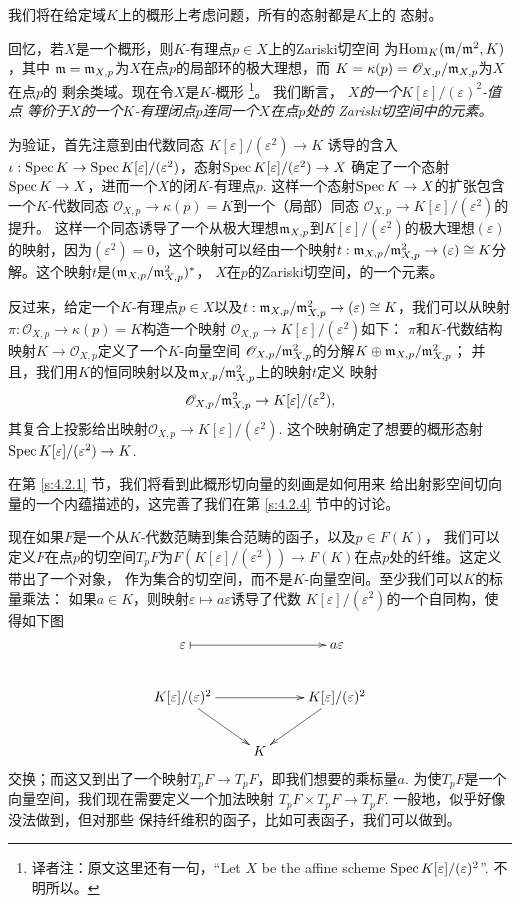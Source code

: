 我们将在给定域$K$上的概形上考虑问题，所有的态射都是$K$上的
态射。

回忆，若$X$是一个概形，则$K$-有理点$p\in X$上的Zariski切空间
为$\operatorname{Hom}_K(\mathfrak{m}/\mathfrak{m}^2,K)$，其中
$\mathfrak{m}=\mathfrak{m}_{X,p}$为$X$在点$p$的局部环的极大理想，而
$K=\kappa(p)=\mathscr O_{X,p}/\mathfrak{m}_{X,p}$为$X$在点$p$的
剩余类域。现在令$X$是$K$-概形%
\footnote{译者注：原文这里还有一句，“Let $X$ be the
affine scheme $\operatorname{Spec} K[\varepsilon]/(\varepsilon)^2$”.
不明所以。}。%
我们断言，
\textit{$X$的一个$K[\varepsilon]/(\varepsilon)^2$-值点
等价于$X$的一个$K$-有理闭点$p$连同一个$X$在点$p$处的
Zariski切空间中的元素。}


为验证，首先注意到由代数同态
$K[\varepsilon]/(\varepsilon^2)
\to K$ 诱导的含入$\iota :\operatorname{Spec} K\to \operatorname{Spec} K[\varepsilon]/
(\varepsilon^2)$，态射$\operatorname{Spec} K[\varepsilon]/(\varepsilon^2)\to X$
确定了一个态射$\operatorname{Spec} K\to X$，进而一个$X$的闭$K$-有理点$p$.
这样一个态射$\operatorname{Spec} K\to X$的扩张包含一个$K$-代数同态
$\mathscr O_{X,p}\to \kappa(p)=K$到一个（局部）同态
$\mathscr O_{X,p}\to K[\varepsilon]/(\varepsilon^2)$的提升。
这样一个同态诱导了一个从极大理想$\mathfrak{m}_{X,p}$到$K[\varepsilon]/
(\varepsilon^2)$的极大理想$(\varepsilon)$的映射，因为$(\varepsilon^2)
=0$，这个映射可以经由一个映射$t:\mathfrak{m}_{X,p}/\mathfrak{m}_{X,p}^2\to (\varepsilon)
\cong K$分解。这个映射$t$是$(\mathfrak{m}_{X,p}/\mathfrak{m}_{X,p}^2)^*$，
$X$在$p$的Zariski切空间，的一个元素。

反过来，给定一个$K$-有理点$p\in X$以及$t:\mathfrak{m}_{X,p}/\mathfrak{m}_{X,p}^2\to
(\varepsilon)\cong K$，我们可以从映射$\pi:\mathscr O_{X,p}\to 
\kappa(p)=K$构造一个映射
$\mathscr O_{X,p}\to K[\varepsilon]/(\varepsilon^2)$如下：
$\pi$和$K$-代数结构映射$K\to \mathscr O_{X,p}$定义了一个$K$-向量空间
$\mathscr O_{X,p}/\mathfrak{m}_{X,p}^2$的分解$K\oplus \mathfrak{m}_{X,p}/\mathfrak{m}_{X,p}^2$；
并且，我们用$K$的恒同映射以及$\mathfrak{m}_{X,p}/\mathfrak{m}_{X,p}^2$上的映射$t$定义
映射
\[
	\mathscr O_{X,p}/\mathfrak{m}_{X,p}^2\to K[\varepsilon]/(\varepsilon^2),
\]
其复合上投影给出映射$\mathscr O_{X,p}\to K[\varepsilon]/
(\varepsilon^2)$. 这个映射确定了想要的概形态射
$\operatorname{Spec} K[\varepsilon]/(\varepsilon^2)\to K$.

在第 \ref{s:4.2.1} 节，我们将看到此概形切向量的刻画是如何用来
给出射影空间切向量的一个内蕴描述的，这完善了我们在第 \ref{s:4.2.4}
节中的讨论。

现在如果$F$是一个从$K$-代数范畴到集合范畴的函子，以及$p\in F(K)$，
我们可以定义$F$在点$p$的切空间$T_pF$为$F(K[\varepsilon] /
(\varepsilon^{2})) \to F(K)$在点$p$处的纤维。这定义带出了一个对象，
作为集合的切空间，而不是$K$-向量空间。至少我们可以$K$的标量乘法：
如果$a\in K$，则映射$\varepsilon\mapsto a\varepsilon$诱导了代数
$K[\varepsilon]/(\varepsilon^2)$的一个自同构，使得如下图
\[
	\xymatrix{
	\varepsilon \ar@{|->}[rr] &  & a\varepsilon\\
	K[\varepsilon]/(\varepsilon)^2 \ar[rr]\ar[rd]& & K[\varepsilon]/(\varepsilon)^2 \ar[ld]\\
	& K &
	}
\]
交换；而这又到出了一个映射$T_pF\to T_pF$，即我们想要的乘标量$a$.
为使$T_pF$是一个向量空间，我们现在需要定义一个加法映射
$T_pF \times T_pF \to T_pF$. 一般地，似乎好像没法做到，但对那些
保持纤维积的函子，比如可表函子，我们可以做到。

